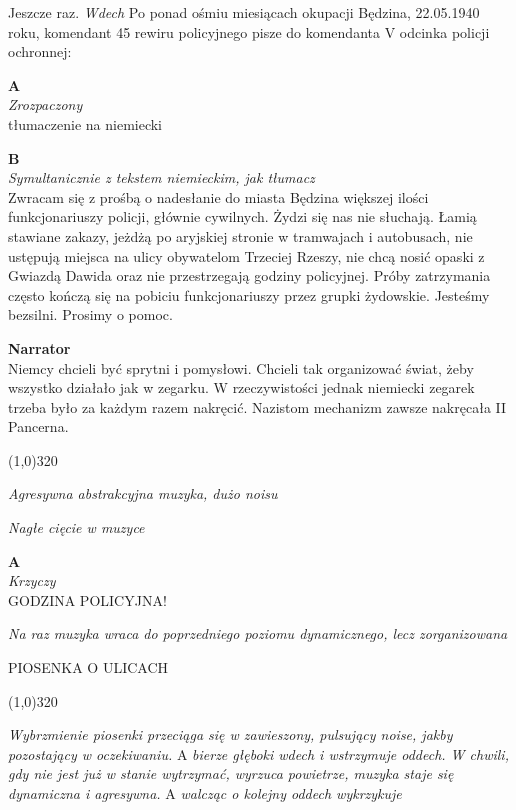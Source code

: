 \documentclass[11pt,a4paper,oneside]{article}
\begin{document}
Jeszcze raz. {\color{light-gray} \emph{Wdech}} Po ponad ośmiu
miesiącach okupacji Będzina, 22.05.1940 roku, komendant 45 rewiru
policyjnego pisze do komendanta V odcinka policji ochronnej:

\textbf{A}\\
{\color{light-gray} \emph{Zrozpaczony}}\\
{\color{red} tłumaczenie na niemiecki}


\textbf{B}\\
{\color{light-gray} \emph{Symultanicznie z tekstem niemieckim, jak tłumacz}}\\
Zwracam się z prośbą o nadesłanie do miasta Będzina większej ilości
funkcjonariuszy policji, głównie cywilnych. Żydzi się nas nie słuchają. Łamią
stawiane zakazy, jeżdżą po aryjskiej stronie w tramwajach i autobusach, nie
ustępują miejsca na ulicy obywatelom Trzeciej Rzeszy, nie chcą nosić opaski
z Gwiazdą Dawida oraz nie przestrzegają godziny policyjnej. Próby zatrzymania
często kończą się na pobiciu funkcjonariuszy przez grupki żydowskie. Jesteśmy 
bezsilni. Prosimy o pomoc.


\textbf{Narrator}\\
Niemcy chcieli być sprytni i pomysłowi. Chcieli tak organizować świat,
żeby wszystko działało jak w zegarku. W rzeczywistości jednak
niemiecki zegarek trzeba było za każdym razem nakręcić. Nazistom
mechanizm zawsze nakręcała II Pancerna. 

\line(1,0){320}

{\color{light-gray} \emph{Agresywna abstrakcyjna muzyka, dużo noisu}}

{\color{light-gray} \emph{Nagłe cięcie w muzyce}}

\textbf{A}\\
{\color{light-gray} \emph{Krzyczy}}\\
GODZINA POLICYJNA!

{\color{light-gray} \emph{Na raz muzyka wraca do poprzedniego poziomu
dynamicznego, lecz zorganizowana}}

{\color{red}
PIOSENKA O ULICACH
}

\line(1,0){320}

{\color{light-gray} \emph{Wybrzmienie piosenki przeciąga się w zawieszony, pulsujący noise, jakby pozostający w oczekiwaniu.} A \emph{bierze głęboki wdech i wstrzymuje oddech. W chwili, gdy nie jest już w stanie wytrzymać, wyrzuca powietrze, muzyka staje się dynamiczna i agresywna.} A \emph{walcząc o kolejny oddech wykrzykuje}}
\end{document}
